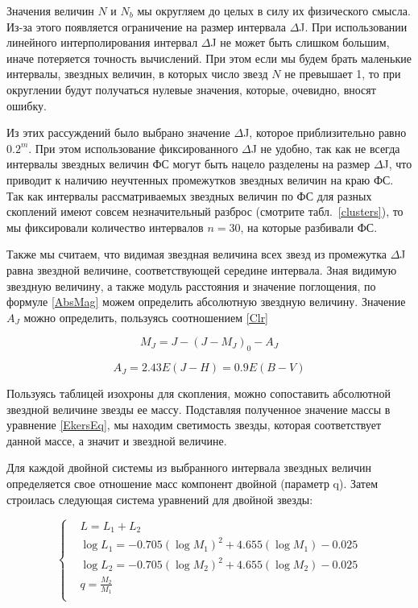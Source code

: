 \documentclass[a4paper,12pt]{article}
\begin{document}
Значения величин $N$ и $N_{b}$ мы округляем до целых в силу их физического смысла. Из-за этого появляется ограничение на размер интервала $\Delta $J. При использовании линейного интерполирования интервал $\Delta $J не может быть слишком большим, иначе потеряется точность вычислений. 
При этом если мы будем брать маленькие интервалы, звездных величин, в которых число звезд $N$ не превышает 1, то при округлении будут получаться нулевые значения, которые, очевидно, вносят ошибку.

Из этих рассуждений было выбрано значение $\Delta $J, которое приблизительно равно $0.2^m$. При этом использование фиксированного $\Delta $J не удобно, так как не всегда интервалы звездных величин ФС могут быть нацело разделены на размер $\Delta $J, что приводит к наличию неучтенных промежутков звездных величин на краю ФС. 
Так как интервалы рассматриваемых звездных величин по ФС для разных скоплений имеют совсем незначительный разброс (смотрите табл.~\ref{clusters}), то мы фиксировали количество интервалов $n=30$, на которые разбивали ФС.  

Также мы считаем, что видимая звездная величина всех звезд из промежутка $\Delta $J равна звездной величине, соответствующей середине интервала. Зная видимую звездную величину, а также модуль расстояния и значение поглощения, по формуле \eqref{AbsMag} можем определить абсолютную звездную величину. Значение $A_J$ можно определить, пользуясь соотношением \eqref{Clr} 

\begin{equation}
M_J=J-(J-M_J)_0-A_J
\label{AbsMag}
\end{equation}

\begin{equation}
A_J=2.43 E(J-H)=0.9 E(B-V)
\label{Clr}
\end{equation}

Пользуясь таблицей изохроны для скопления, можно сопоставить абсолютной звездной величине звезды ее массу. Подставляя полученное значение массы в уравнение \eqref{EkersEq}, мы находим светимость звезды, которая соответствует данной массе, а значит и звездной величине.

Для каждой двойной системы из выбранного интервала звездных величин определяется свое отношение масс компонент двойной (параметр q). Затем строилась следующая система уравнений для двойной звезды:

\begin{equation}
\left\{
\begin{aligned}
&L=L_1+L_2\\
&\log{L_1}= -0.705(\log{M_1})^2  + 4.655(\log {M_1}) - 0.025\\
&\log{L_2}= -0.705(\log{M_2})^2  + 4.655(\log {M_2}) - 0.025\\
&q=\frac{M_2}{M_1}\\
\end{aligned}
\right.\label{MAINsystem}
\end{equation}
\end{document}
